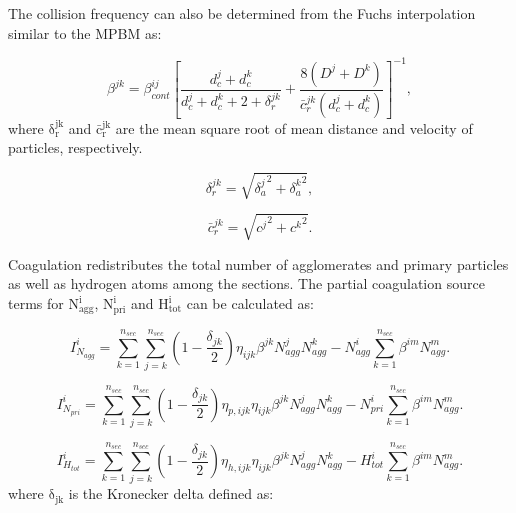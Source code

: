 The collision frequency can also be determined from the Fuchs interpolation similar to the MPBM as:

\begin{equation}
	\beta^{jk}=
	\beta^{ij}_{cont}
	\left[
		\frac{d^j_c+d^k_c}{d^j_c+d^k_c+2+\delta^{jk}_r}+
		\frac{8\left(D^j+D^k\right)}
		{\bar{c}^{jk}_r\left(d^j_c+d^k_c\right)}
	\right]^{-1}
	\label{eqn:betafuchssect},
\end{equation}
\noindent where $\mathrm{\delta^{jk}_r}$ and $\mathrm{\bar{c}^{jk}_r}$ are the mean square root of mean distance and velocity of particles, respectively.

\begin{equation}
 	\delta^{jk}_r=
	\sqrt{
		{\delta^j_a}^2+{\delta^k_a}^2
	}
 	\label{eqn:sqrtmeandist},
\end{equation}

\begin{equation}
	\bar{c}^{jk}_r=
	\sqrt{
		{c^j}^2+{c^k}^2
	}
	\label{eqn:sqrtmeanvel}.
\end{equation}

Coagulation redistributes the total number of agglomerates and primary particles as well as hydrogen atoms among the sections. The partial coagulation source terms for $\mathrm{N^i_{agg}}$, $\mathrm{N^i_{pri}}$ and $\mathrm{H^i_{tot}}$ can be calculated as:

\begin{equation}
	I^i_{N_{agg}}
	=
	\sum_{k=1}^{n_{sec}}\sum_{j=k}^{n_{sec}}
	\left(
		1-\frac{\delta_{jk}}{2}
	\right)
	\eta_{ijk}\beta^{jk}N^j_{agg}N^k_{agg}
	-
	N^i_{agg}
	\sum_{k=1}^{n_{sec}}\beta^{im}N^m_{agg}
	\label{eqn:IcoagNaggsect}.
\end{equation}

\begin{equation}
	I^i_{N_{pri}}
	=
	\sum_{k=1}^{n_{sec}}\sum_{j=k}^{n_{sec}}
	\left(
	1-\frac{\delta_{jk}}{2}
	\right)
	\eta_{p,ijk}\eta_{ijk}\beta^{jk}N^j_{agg}N^k_{agg}
	-
	N^i_{pri}
	\sum_{k=1}^{n_{sec}}\beta^{im}N^m_{agg}
	\label{eqn:IcoagNprisect}.
\end{equation}

\begin{equation}
	I^i_{H_{tot}}
	=
	\sum_{k=1}^{n_{sec}}\sum_{j=k}^{n_{sec}}
	\left(
	1-\frac{\delta_{jk}}{2}
	\right)
	\eta_{h,ijk}\eta_{ijk}\beta^{jk}N^j_{agg}N^k_{agg}
	-
	H^i_{tot}
	\sum_{k=1}^{n_{sec}}\beta^{im}N^m_{agg}
	\label{eqn:IcoagHtotsect}.
\end{equation}
\noindent where $\mathrm{\delta_{jk}}$ is the Kronecker delta defined as:

